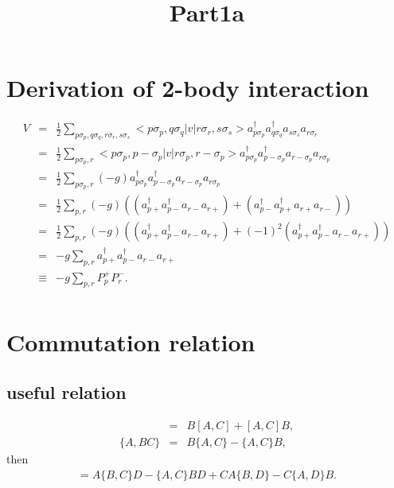 \documentclass{article}
\title{Part1a}
\date{}
\begin{document}
\maketitle

\section{Derivation of 2-body interaction}

\begin{eqnarray*}
V &=& \frac{1}{2} \sum_{p\sigma_p,q\sigma_q,r\sigma_r,s\sigma_s} <p\sigma_p,q\sigma_q|v|r\sigma_r,s\sigma_s> a_{p \sigma_p}^{\dagger} a_{q \sigma_q}^{\dagger} a_{s \sigma_s} a_{r \sigma_r} \\
 &=& \frac{1}{2} \sum_{p\sigma_p,r} <p\sigma_p,p-\sigma_p|v|r\sigma_p,r-\sigma_p> a_{p \sigma_p}^{\dagger} a_{p -\sigma_p}^{\dagger} a_{r -\sigma_p} a_{r \sigma_p} \\
 &=& \frac{1}{2} \sum_{p\sigma_p,r} (-g) a_{p \sigma_p}^{\dagger} a_{p -\sigma_p}^{\dagger} a_{r -\sigma_p} a_{r \sigma_p} \\
 &=& \frac{1}{2} \sum_{p,r} (-g) \left( \left( a_{p +}^{\dagger} a_{p -}^{\dagger} a_{r -} a_{r +}  \right) + \left( a_{p -}^{\dagger} a_{p +}^{\dagger} a_{r +} a_{r -} \right) \right) \\
 &=& \frac{1}{2} \sum_{p,r} (-g) \left( \left( a_{p +}^{\dagger} a_{p -}^{\dagger} a_{r -} a_{r +}  \right) + (-1)^2 \left( a_{p +}^{\dagger} a_{p -}^{\dagger} a_{r -} a_{r +}  \right) \right) \\
 &=& -g \sum_{p,r} a_{p +}^{\dagger} a_{p -}^{\dagger} a_{r -} a_{r +} \\
 &\equiv& -g \sum_{p,r} P_p^{+} P_r^{-}. \\
\end{eqnarray*}

\section{Commutation relation}
\subsection{useful relation}
\label{use}
\begin{eqnarray*}
[A,BC] &=& B[A,C] + [A,C]B, \\
\bigl\{ A,BC \bigr\} &=& B \bigl\{ A,C \bigr\} - \bigl\{ A,C \bigr\} B,
\end{eqnarray*}
then
\begin{eqnarray*}
[AB,CD] = A \bigl\{ B,C \bigr\} D - \bigl\{ A,C \bigr\} B D + C A \bigl\{ B,D \bigr\} - C \bigl\{ A,D \bigr\} B.
\end{eqnarray*}
\end{document}
